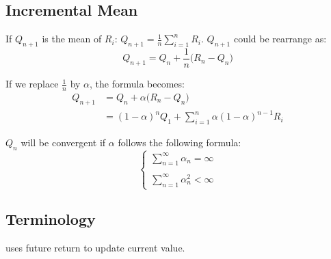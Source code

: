 \subsection{Incremental Mean}

If $Q_{n+1}$ is the mean of $R_i$: $Q_{n+1} = \frac{1}{n} \sum\limits_{i=1}^n R_i$. $Q_{n+1}$ could be rearrange as:
\begin{equation}
	Q_{n+1} = Q_n + \frac{1}{n} \Big( R_n - Q_n \Big)
\end{equation}

If we replace $\frac{1}{n}$ by $\alpha$, the formula becomes:
\begin{equation}
	\begin{aligned}
		Q_{n+1} &= Q_n + \alpha \Big( R_n - Q_n \Big)\\
		&= (1-\alpha )^n Q_1 + \sum_{i=1}^n \alpha (1 - \alpha )^{n-1}R_i
	\end{aligned}
\end{equation}

$Q_n$ will be convergent if $\alpha$ follows the following formula:
\begin{equation}\label{convergenceofsequence}
	\begin{cases}
		\sum\limits_{n=1}^\infty \alpha_n = \infty \\
		\\
		\sum\limits_{n=1}^\infty \alpha_n^2 < \infty
	\end{cases}
\end{equation}


\subsection{Terminology}

 uses future return to update current value.


